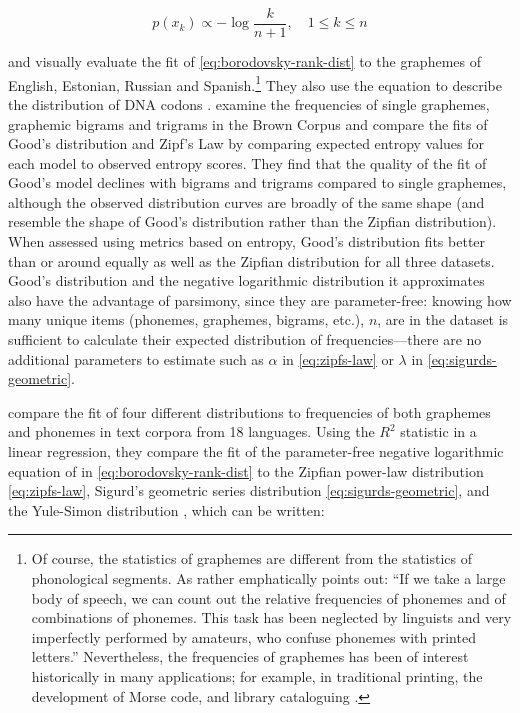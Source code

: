 \begin{equation}
p(x_k) \propto -\log \frac{k}{n+1}, \quad 1 \leq k \leq n
\label{eq:borodovsky-rank-dist}
\end{equation}

\textcite{gusein-zade_distribution_1988} and \textcite{borodovsky_general_1989} visually evaluate the fit of \eqref{eq:borodovsky-rank-dist} to the graphemes of English, Estonian, Russian and Spanish.\footnote{Of course, the statistics of graphemes are different from the statistics of phonological segments. As \textcite[pp.~136--137]{bloomfield_language_1935} rather emphatically points out: ``If we take a large body of speech, we can count out the relative frequencies of phonemes and of combinations of phonemes. This task has been neglected by linguists and very imperfectly performed by amateurs, who confuse phonemes with printed letters.'' Nevertheless, the frequencies of graphemes has been of interest historically in many applications; for example, in traditional printing, the development of Morse code, and library cataloguing \autocite[pp.~550--551]{witten_source_1990}.} They also use the equation to describe the distribution of DNA codons \autocite{borodovsky_general_1989}. \textcite[pp.~563--566]{witten_source_1990} examine the frequencies of single graphemes, graphemic bigrams and trigrams in the Brown Corpus and compare the fits of Good's distribution and Zipf's Law by comparing expected entropy values for each model to observed entropy scores. They find that the quality of the fit of Good's model declines with bigrams and trigrams compared to single graphemes, although the observed distribution curves are broadly of the same shape (and resemble the shape of Good's distribution rather than the Zipfian distribution). When assessed using metrics based on entropy, Good's distribution fits better than or around equally as well as the Zipfian distribution for all three datasets. Good's distribution and the negative logarithmic distribution it approximates also have the advantage of parsimony, since they are parameter-free: knowing how many unique items (phonemes, graphemes, bigrams, etc.), \(n\), are in the dataset is sufficient to calculate their expected distribution of frequencies---there are no additional parameters to estimate such as \(\alpha\) in \eqref{eq:zipfs-law} or \(\lambda\) in \eqref{eq:sigurds-geometric}.

\textcite{martindale_comparison_1996} compare the fit of four different distributions to frequencies of both graphemes and phonemes in text corpora from 18 languages. Using the \(R^2\) statistic in a linear regression, they compare the fit of the parameter-free negative logarithmic equation of \textcite{borodovsky_general_1989} in \eqref{eq:borodovsky-rank-dist} to the Zipfian power-law distribution \eqref{eq:zipfs-law}, Sigurd's geometric series distribution \eqref{eq:sigurds-geometric}, and the Yule-Simon distribution \autocites{yule_mathematical_1925}{simon_class_1955}, which can be written:

